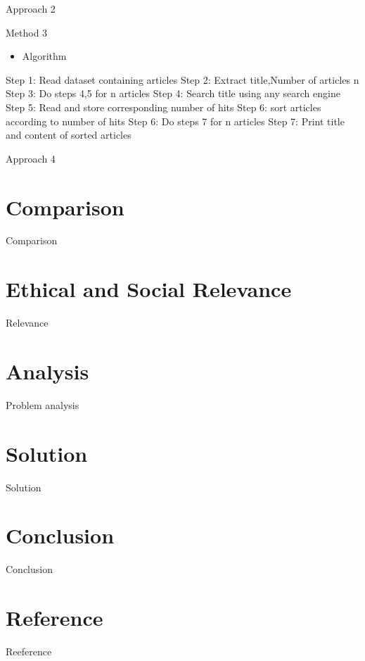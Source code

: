 \documentclass{beamer}
\begin{document}
	\begin{frame}{Approach 2}
		
	\end{frame}
	\begin{frame}{Method 3}
		\begin{itemize}
			\item Algorithm
		\end{itemize}
		Step 1: Read dataset containing articles \newline
		Step 2: Extract title,Number of articles n \newline
		Step 3: Do steps 4,5 for n articles \newline
		Step 4: Search title using any search engine \newline
		Step 5: Read and store corresponding number of hits \newline
		Step 6: sort articles according to number of hits \newline
		Step 6: Do steps 7 for n articles \newline
		Step 7: Print title and content of sorted articles
		
	\end{frame}
	\begin{frame}{Approach 4}
		
	\end{frame}
	\section{Comparison}
	\begin{frame}{Comparison}
	\end{frame}
	\section{Ethical and Social Relevance}
	\begin{frame}{Relevance}
	\end{frame}
	\section{Analysis}
	\begin{frame}{Problem analysis}
	\end{frame}
	\section{Solution}
	\begin{frame}{Solution}
	\end{frame}
	\section{Conclusion}
	\begin{frame}{Conclusion}
	\end{frame}
	\section{Reference}
	\begin{frame}{Reeference}
	\end{frame}
\end{document}
